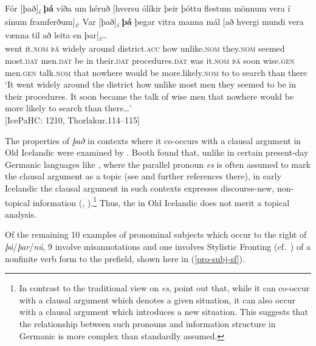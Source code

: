 \documentclass[output=paper,colorlinks,citecolor=brown]{langscibook}
\begin{document}
\ea \label{dummy-pre} 
 \gll Fór [það]\textsubscript{\textit{i}} \textbf{þá} víða um héruð [hversu ólíkir þeir þóttu flestum mönnum vera í sínum framferðum]\textsubscript{\textit{i}}. Var [það]\textsubscript{\textit{i}} \textbf{þá} þegar vitra manna mál [að hvergi mundi vera vænna til að leita en þar]\textsubscript{\textit{i}}\dots\\
 went it.\textsc{nom} \textsc{þá} widely around district.\textsc{acc} how unlike.\textsc{nom} they.\textsc{nom} seemed most.\textsc{dat} men.\textsc{dat} be in their.\textsc{dat} procedures.\textsc{dat} was it.\textsc{nom} \textsc{þá} soon wise.\textsc{gen} men.\textsc{gen} talk.\textsc{nom} that nowhere would be more.likely.\textsc{nom} to to search than there\\
 \glt `It went widely around the district how unlike most men they seemed to be in their procedures. It soon became the talk of wise men that nowhere would be more likely to search than there\dots'\\ \hfill [IcePaHC: 1210, Thorlakur.114--115]
\z 

\noindent The properties of \textit{það} in contexts where it co-occurs with a clausal argument in Old Icelandic were examined by \citet{booth2018,booth2019cataphora}. Booth found that, unlike in certain present-day Germanic languages like , where the parallel pronoun \textit{es} is often assumed to mark the clausal argument as a topic (see \citealp{Berman1998argument} and further references there),
in early Icelandic the clausal argument in such contexts expresses discourse-new, non-topical information (\citealp[chapter 7]{booth2018}, \citealp{booth2019cataphora}).\footnote{In contrast to the traditional view on  \textit{es}, \citet[44--45]{fuss2023historical} point out that, while it can co-occur with a clausal argument which denotes a given situation, it can also occur with a clausal argument which introduces a new situation. This suggests that the relationship between such pronouns and information structure in Germanic is more complex than standardly assumed.} Thus, the  in Old Icelandic does not merit a topical analysis.

Of the remaining 10 examples of pronominal subjects which occur to the right of \textit{þá}/\textit{þar}/\textit{nú}, 9 involve misannotations and one involves Stylistic Fronting 
 (cf.~\citealp{Maling1990}) of a nonfinite verb form to the prefield, shown here in (\ref{pro-subj-sf}).
    
\end{document}
